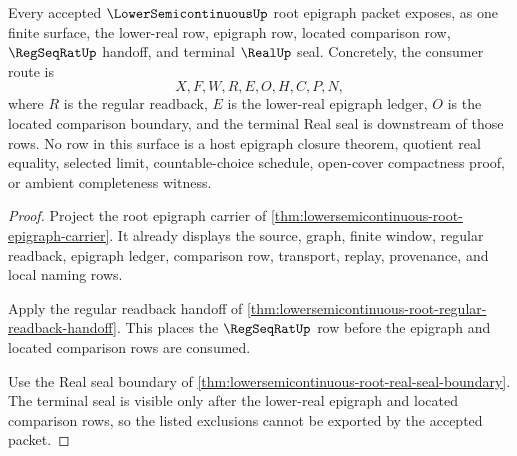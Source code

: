 \begin{theorem}
\label{thm:lowersemicontinuous-root-epigraph-rows}
Every accepted $\LowerSemicontinuousUp$ root epigraph packet exposes, as one finite surface, the lower-real row, epigraph row, located comparison row, $\RegSeqRatUp$ handoff, and terminal $\RealUp$ seal. Concretely, the consumer route is
$$
X,F,W,R,E,O,H,C,P,N,
$$
where $R$ is the regular readback, $E$ is the lower-real epigraph ledger, $O$ is the located comparison boundary, and the terminal Real seal is downstream of those rows. No row in this surface is a host epigraph closure theorem, quotient real equality, selected limit, countable-choice schedule, open-cover compactness proof, or ambient completeness witness.
\end{theorem}
\begin{proof}
Project the root epigraph carrier of \autoref{thm:lowersemicontinuous-root-epigraph-carrier}. It already displays the source, graph, finite window, regular readback, epigraph ledger, comparison row, transport, replay, provenance, and local naming rows.

Apply the regular readback handoff of \autoref{thm:lowersemicontinuous-root-regular-readback-handoff}. This places the $\RegSeqRatUp$ row before the epigraph and located comparison rows are consumed.

Use the Real seal boundary of \autoref{thm:lowersemicontinuous-root-real-seal-boundary}. The terminal seal is visible only after the lower-real epigraph and located comparison rows, so the listed exclusions cannot be exported by the accepted packet.
\end{proof}

